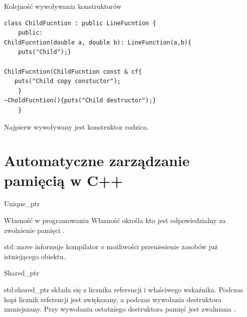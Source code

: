 \documentclass[xcolor=table]{beamer}
\begin{document}
\begin{frame}[containsverbatim]{Kolejność wywoływania konstruktorów}
\begin{verbatim}
class ChildFucntion : public LineFucntion { 
    public:
ChildFucntion(double a, double b): LineFunction(a,b){
    puts("Child");}
    
ChildFucntion(ChildFucntion const & cf{
   puts("Child copy constuctor");
    }
~CholdFucntion(){puts("Child destructor");}
    }
\end{verbatim}
\begin{block}{}
    Najpierw wywoływany jest konstruktor rodzica.
\end{block}
\end{frame}
\section{Automatyczne zarządzanie pamięcią w C++}

\begin{frame}{Unique\_ptr}
    \begin{block}{Własność w programowaniu}
        Własność określa kto jest odpowiedzialny za zwolnienie pamięci \cite{rust-ownership, cpp-unique-ptr}.
    \end{block}

    \begin{block}{}
        std::move informuje kompilator o możliwości przeniesienie zasobów już istniejącego obiektu.
    \end{block}
\end{frame}

\begin{frame}{Shared\_ptr}
    \begin{block}{}
        std:shared\_ptr składa się z licznika referencji i właściwego wskaźnika. 
        Podczas kopi licznik referencji jest zwiększany, a podczas wywołania destruktora zmniejszany. 
        Przy wywołaniu ostatniego destruktora pamięć jest zwalniana \cite{cpp-shared-ptr}. 
    \end{block}
\end{frame}
\end{document}
